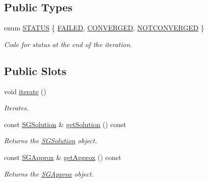 \subsection*{Public Types}
\begin{DoxyCompactItemize}
\item 
enum \hyperlink{classSGSolverWorker_abf12cd2fb0c6957ef6d5be6248c60abf}{S\+T\+A\+T\+US} \{ \hyperlink{classSGSolverWorker_abf12cd2fb0c6957ef6d5be6248c60abfaf1af418039d274d5b0997663e4b85e41}{F\+A\+I\+L\+ED}, 
\hyperlink{classSGSolverWorker_abf12cd2fb0c6957ef6d5be6248c60abfabb521a8551120af9a47410ed59676456}{C\+O\+N\+V\+E\+R\+G\+ED}, 
\hyperlink{classSGSolverWorker_abf12cd2fb0c6957ef6d5be6248c60abfad020062a9461a44dc0c3dfe51a30636a}{N\+O\+T\+C\+O\+N\+V\+E\+R\+G\+ED}
 \}\begin{DoxyCompactList}\small\item\em Code for status at the end of the iteration. \end{DoxyCompactList}
\end{DoxyCompactItemize}
\subsection*{Public Slots}
\begin{DoxyCompactItemize}
\item 
void \hyperlink{classSGSolverWorker_aeb03e91da258a3c13e8d13b66605b973}{iterate} ()
\begin{DoxyCompactList}\small\item\em Iterates. \end{DoxyCompactList}\item 
\mbox{\label{classSGSolverWorker_a6a7eed33f6b8bc796c16a2fdeb173ab9}} 
const \hyperlink{classSGSolution}{S\+G\+Solution} \& \hyperlink{classSGSolverWorker_a6a7eed33f6b8bc796c16a2fdeb173ab9}{get\+Solution} () const
\begin{DoxyCompactList}\small\item\em Returns the \hyperlink{classSGSolution}{S\+G\+Solution} object. \end{DoxyCompactList}\item 
\mbox{\label{classSGSolverWorker_a6be1264652697677010fee3457188ee3}} 
const \hyperlink{classSGApprox}{S\+G\+Approx} \& \hyperlink{classSGSolverWorker_a6be1264652697677010fee3457188ee3}{get\+Approx} () const
\begin{DoxyCompactList}\small\item\em Returns the \hyperlink{classSGApprox}{S\+G\+Approx} object. \end{DoxyCompactList}\end{DoxyCompactItemize}
